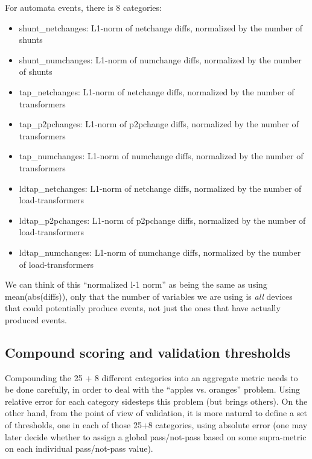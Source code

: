 \documentclass[11pt, a4paper, twoside, titlepage]{article}
\begin{document}
For automata events, there is 8 categories:
\begin{itemize}
\item shunt\_netchanges: L1-norm of netchange diffs, normalized by the number of shunts
\item shunt\_numchanges: L1-norm of numchange diffs, normalized by the number of shunts
\item tap\_netchanges: L1-norm of netchange diffs, normalized by the number of transformers
\item tap\_p2pchanges: L1-norm of p2pchange diffs, normalized by the number of transformers
\item tap\_numchanges:  L1-norm of numchange diffs, normalized by the number of transformers
\item ldtap\_netchanges:  L1-norm of netchange diffs, normalized by the number of load-transformers
\item ldtap\_p2pchanges: L1-norm of p2pchange diffs, normalized by the number of load-transformers
\item ldtap\_numchanges: L1-norm of numchange diffs, normalized by the number of load-transformers
\end{itemize}  

We can think of this ``normalized l-1 norm'' as being the same as using
mean(abs(diffs)), only that the number of variables we are using is \emph{all}
devices that could potentially produce events, not just the ones that have
actually produced events.


\subsection{Compound scoring and validation thresholds}


Compounding the 25 + 8 different categories into an aggregate metric
needs to be done carefully, in order to deal with the ``apples vs. oranges''
problem. Using relative error for each category sidesteps this problem (but
brings others).  On the other hand, from the point of view of validation, it is
more natural to define a set of thresholds, one in each of those 25+8
categories, using absolute error (one may later decide whether to assign a
global pass/not-pass based on some supra-metric on each individual pass/not-pass
value).
\end{document}
